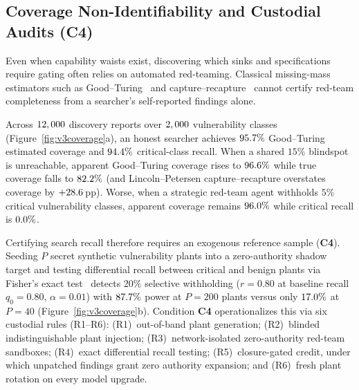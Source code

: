\subsection{Coverage Non-Identifiability and Custodial Audits (\textbf{C4})}

Even when capability waists exist, discovering which sinks and specifications require gating often relies on automated red-teaming. Classical missing-mass estimators such as Good--Turing~\cite{good,mcallester} and capture--recapture~\cite{chapman1951} cannot certify red-team completeness from a searcher's self-reported findings alone.



Across \(12,000\) discovery reports over \(2,000\) vulnerability classes (Figure~\ref{fig:v3coverage}a), an honest searcher achieves \(95.7\%\) Good--Turing estimated coverage and \(94.4\%\) critical-class recall. When a shared \(15\%\) blindspot is unreachable, apparent Good--Turing coverage rises to \(96.6\%\) while true coverage falls to \(82.2\%\) (and Lincoln--Petersen capture--recapture overstates coverage by \(+28.6\)\,pp). Worse, when a strategic red-team agent withholds \(5\%\) critical vulnerability classes, apparent coverage remains \(96.0\%\) while critical recall is \textbf{\(0.0\%\)}.

Certifying search recall therefore requires an exogenous reference sample (\textbf{C4}). Seeding \(P\) secret synthetic vulnerability plants into a zero-authority shadow target and testing differential recall between critical and benign plants via Fisher's exact test~\cite{fisher} detects \(20\%\) selective withholding (\(r = 0.80\) at baseline recall \(q_0 = 0.80\), \(\alpha = 0.01\)) with \(87.7\%\) power at \(P = 200\) plants versus only \(17.0\%\) at \(P = 40\) (Figure~\ref{fig:v3coverage}b). Condition \textbf{C4} operationalizes this via six custodial rules (R1--R6): (R1)~out-of-band plant generation; (R2)~blinded indistinguishable plant injection; (R3)~network-isolated zero-authority red-team sandboxes; (R4)~exact differential recall testing; (R5)~closure-gated credit, under which unpatched findings grant zero authority expansion; and (R6)~fresh plant rotation on every model upgrade.
